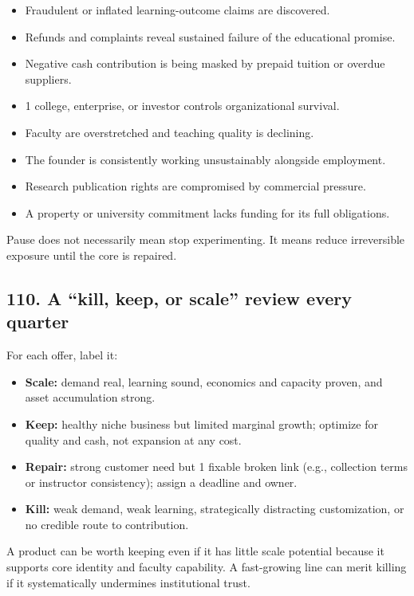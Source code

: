 \begin{itemize}[leftmargin=*,itemsep=1.5pt]
  \item Fraudulent or inflated learning-outcome claims are discovered.
  \item Refunds and complaints reveal sustained failure of the educational promise.
  \item Negative cash contribution is being masked by prepaid tuition or overdue suppliers.
  \item 1 college, enterprise, or investor controls organizational survival.
  \item Faculty are overstretched and teaching quality is declining.
  \item The founder is consistently working unsustainably alongside employment.
  \item Research publication rights are compromised by commercial pressure.
  \item A property or university commitment lacks funding for its full obligations.
\end{itemize}

Pause does not necessarily mean stop experimenting. It means reduce irreversible exposure until the core is repaired.

\subsection{110. A ``kill, keep, or scale'' review every quarter}

For each offer, label it:

\begin{itemize}[leftmargin=*,itemsep=1.5pt]
  \item \textbf{Scale:} demand real, learning sound, economics and capacity proven, and asset accumulation strong.
  \item \textbf{Keep:} healthy niche business but limited marginal growth; optimize for quality and cash, not expansion at any cost.
  \item \textbf{Repair:} strong customer need but 1 fixable broken link (e.g., collection terms or instructor consistency); assign a deadline and owner.
  \item \textbf{Kill:} weak demand, weak learning, strategically distracting customization, or no credible route to contribution.
\end{itemize}

A product can be worth keeping even if it has little scale potential because it supports core identity and faculty capability. A fast-growing line can merit killing if it systematically undermines institutional trust.

